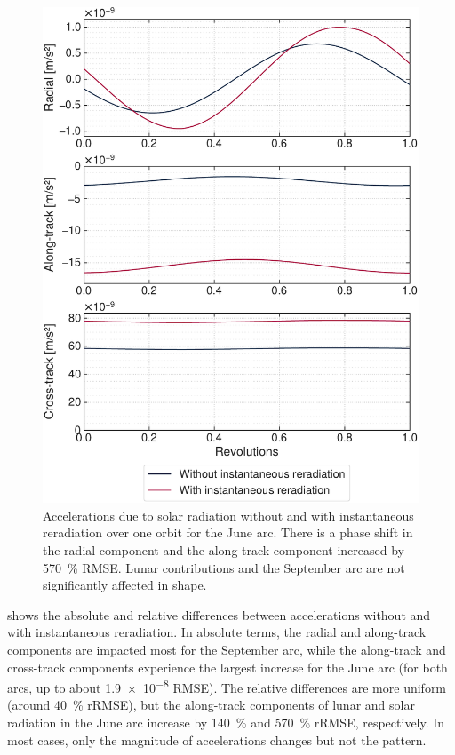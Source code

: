 \begin{figure}[t]
    \centering
    \includegraphics[width=\linewidth]{figures/plots/acc_reradiation_sun_jun.pdf}
    \caption{Accelerations due to solar radiation without and with instantaneous reradiation over one orbit for the June arc. There is a phase shift in the radial component and the along-track component increased by \qty{570}{\percent} \gls{RMSE}. Lunar contributions and the September arc are not significantly affected in shape.}
    \label{fig:acc-reradiation}
\end{figure}

 shows the absolute and relative differences between accelerations without and with instantaneous reradiation. In absolute terms, the radial and along-track components are impacted most for the September arc, while the along-track and cross-track components experience the largest increase for the June arc (for both arcs, up to about \qty{1.9e-8}{\acc} \gls{RMSE}). The relative differences are more uniform (around \qty{40}{\percent} \gls{rRMSE}), but the along-track components of lunar and solar radiation in the June arc increase by \qty{140}{\percent} and \qty{570}{\percent} \gls{rRMSE}, respectively. In most cases, only the magnitude of accelerations changes but not the pattern.

